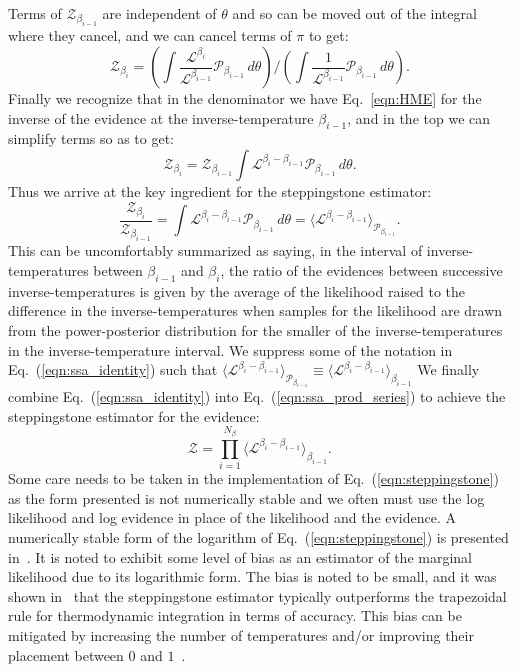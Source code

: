 Terms of $\mathcal{Z}_{\beta_{i-1}}$ are independent of $\theta$ and so can be moved out of the integral where they cancel, and we can cancel terms of $\pi$ to get:
\begin{equation}
    \mathcal{Z}_{\beta_i} = \left(\int \frac{ \mathcal{L}^{\beta_i} }{\mathcal{L}^{\beta_{i-1}}} \mathcal{P}_{\beta_{i-1}} \, d\theta\right) \bigg / \left(\int \frac{1}{ \mathcal{L}^{\beta_{i-1}}} \mathcal{P}_{\beta_{i-1}} \, d\theta\right).
\end{equation}
Finally we recognize that in the denominator we have Eq.~\ref{eqn:HME} for the inverse of the evidence at the inverse-temperature $\beta_{i-1}$, and in the top we can simplify terms so as to get:
\begin{equation}
    \mathcal{Z}_{\beta_i} = \mathcal{Z}_{\beta_{i-1}} \int \mathcal{L}^{\beta_i - \beta_{i-1}}  \mathcal{P}_{\beta_{i-1}} \, d\theta.
\end{equation}
Thus we arrive at the key ingredient for the steppingstone estimator:
\begin{equation}\label{eqn:ssa_identity}
    \frac{\mathcal{Z}_{\beta_i}}{\mathcal{Z}_{\beta_{i-1}}} = \int \mathcal{L}^{\beta_i - \beta_{i-1}}  \mathcal{P}_{\beta_{i-1}} \, d\theta = \langle \mathcal{L}^{\beta_i - \beta_{i-1}} \rangle_{\mathcal{P}_{\beta_{i-1}}}.
\end{equation}
This can be uncomfortably summarized as saying, in the interval of inverse-temperatures between $\beta_{i-1}$ and $\beta_i$, the ratio of the evidences between successive inverse-temperatures is given by the average of the likelihood raised to the difference in the inverse-temperatures when samples for the likelihood are drawn from the power-posterior distribution for the smaller of the  inverse-temperatures in the inverse-temperature interval. We suppress some of the notation in Eq.~(\ref{eqn:ssa_identity}) such that $\langle \mathcal{L}^{\beta_i - \beta_{i-1}} \rangle_{\mathcal{P}_{\beta_{i-1}}} \equiv \langle \mathcal{L}^{\beta_i - \beta_{i-1}} \rangle_{\beta_{i-1}}$ We finally combine Eq.~(\ref{eqn:ssa_identity}) into Eq.~(\ref{eqn:ssa_prod_series}) to achieve the steppingstone estimator for the evidence:
\begin{equation}\label{eqn:steppingstone}
    \mathcal{Z} = \prod_{i=1}^{N_\beta} \langle \mathcal{L}^{\beta_i - \beta_{i-1}} \rangle_{\beta_{i-1}}. 
\end{equation}
Some care needs to be taken in the implementation of Eq.~(\ref{eqn:steppingstone}) as the form presented is not numerically stable and we often must use the log likelihood and log evidence in place of the likelihood and the evidence. A numerically stable form of the logarithm of Eq.~(\ref{eqn:steppingstone}) is presented in~\cite{xie2010improving}. It is noted to exhibit some level of bias as an estimator of the marginal likelihood due to its logarithmic form. The bias is noted to be small, and it was shown in~\cite{xie2010improving} that the steppingstone estimator typically outperforms the trapezoidal rule for thermodynamic integration in terms of accuracy. This bias can be mitigated by increasing the number of temperatures and/or improving their placement between $0$ and $1$~\citep{xie2010improving}.

